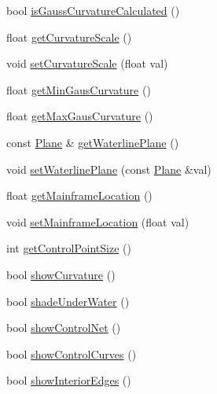 \begin{DoxyCompactItemize}
bool \hyperlink{classShipCADGeometry_1_1SubdivisionSurface_aa6e07e073f76fb31d013103c8709f923}{is\-Gauss\-Curvature\-Calculated} ()
\item 
float \hyperlink{classShipCADGeometry_1_1SubdivisionSurface_ae6e80283a5c978dac2c912b365e28127}{get\-Curvature\-Scale} ()
\item 
void \hyperlink{classShipCADGeometry_1_1SubdivisionSurface_a660c1de6bb820c26895d4abe05befa79}{set\-Curvature\-Scale} (float val)
\item 
float \hyperlink{classShipCADGeometry_1_1SubdivisionSurface_acd42c6cedf4c0986e93c9ab991b034be}{get\-Min\-Gaus\-Curvature} ()
\item 
float \hyperlink{classShipCADGeometry_1_1SubdivisionSurface_ad36b9da92eb1c41ec5cecc1635a91dd6}{get\-Max\-Gaus\-Curvature} ()
\item 
const \hyperlink{classShipCADGeometry_1_1Plane}{Plane} \& \hyperlink{classShipCADGeometry_1_1SubdivisionSurface_a2707c2ff8d33de67c1e7027fcb1dcbf2}{get\-Waterline\-Plane} ()
\item 
void \hyperlink{classShipCADGeometry_1_1SubdivisionSurface_a5e16740196e65aa6590d5816b5425fed}{set\-Waterline\-Plane} (const \hyperlink{classShipCADGeometry_1_1Plane}{Plane} \&val)
\item 
float \hyperlink{classShipCADGeometry_1_1SubdivisionSurface_abe54fc725cc253d946470fe6eb8b59a9}{get\-Mainframe\-Location} ()
\item 
void \hyperlink{classShipCADGeometry_1_1SubdivisionSurface_a8bfafae576716a8c98dad4db4c79b0f8}{set\-Mainframe\-Location} (float val)
\item 
int \hyperlink{classShipCADGeometry_1_1SubdivisionSurface_ad246b6511bb0d1877edeec53f6a48501}{get\-Control\-Point\-Size} ()
\item 
bool \hyperlink{classShipCADGeometry_1_1SubdivisionSurface_a5cfac5d230987823a2c67b9f1ef5b850}{show\-Curvature} ()
\item 
bool \hyperlink{classShipCADGeometry_1_1SubdivisionSurface_aa40e92058695659d80a4283a9d71f2e4}{shade\-Under\-Water} ()
\item 
bool \hyperlink{classShipCADGeometry_1_1SubdivisionSurface_a8bcb27aafb421ec73ee60f1a80fddb9d}{show\-Control\-Net} ()
\item 
bool \hyperlink{classShipCADGeometry_1_1SubdivisionSurface_a0d71d0c19d12fdfeeaa962d4f94f33fe}{show\-Control\-Curves} ()
\item 
bool \hyperlink{classShipCADGeometry_1_1SubdivisionSurface_af17854000a39122b592ee59d84132483}{show\-Interior\-Edges} ()

\end{DoxyCompactItemize}
